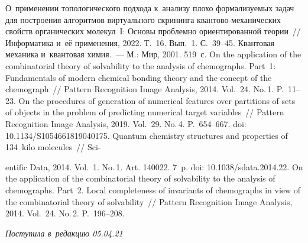 \begin{multicols}{2}
\vspace*{-6pt}

{\small\frenchspacing
 {%
 \begin{thebibliography}{9}
 
 \vspace*{-2pt}
 
   О~применении топологического подхода к~анализу плохо формализуемых задач для 
построения алгоритмов виртуального скрининга кван\-то\-во-ме\-ха\-ни\-че\-ских свойств 
органических молекул~I: Основы проблемно ориентированной теории~// Информатика и~её 
применения, 2022. Т.~16. Вып.~1. С.~39--45.
   Квантовая механика и~квантовая химия.~--- М.: Мир, 2001. 519~с.
   On the application of the combinatorial theory of 
solvability to the analysis of chemographs. Part~1: Fundamentals of modern chemical bonding 
theory and the concept of the chemograph~// Pattern Recognition Image Analysis, 2014. Vol.~24. 
No.\,1. P.~11--23.
   On the procedures of generation of numerical features over 
partitions of sets of objects in the problem of predicting numerical target variables~// Pattern 
Recognition Image Analysis, 2019. Vol.~29. No.\,4. P.~654--667. doi: 
10.1134/S1054661819040175.
   Quantum chemistry structures and properties of 
134~kilo molecules~// Sci-\linebreak\vspace*{-11pt} 

\columnbreak

\noindent
entific Data, 2014. Vol.~1. No.\,1. Art. 140022.  7~p. doi: 10.1038/sdata.2014.22.
   On the application of the combinatorial theory of 
solvability to the analysis of chemographs. Part~2. Local completeness of invariants of chemographs 
in view of the combinatorial theory of solvability~// Pattern Recognition Image Analysis, 2014. 
Vol.~24. No.\,2. P.~196--208.
\end{thebibliography}

 }
 }

\end{multicols}

\vspace*{-8pt}

\hfill{\small\textit{Поступила в~редакцию 05.04.21}}

